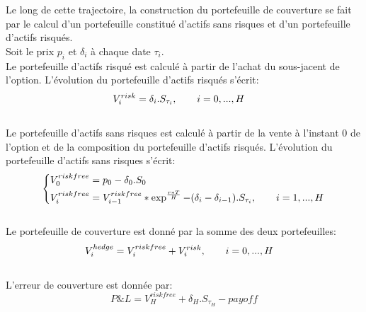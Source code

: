 \documentclass[french,12pt,a4paper]{article}
\begin{document}
Le long de cette trajectoire, la construction du portefeuille de couverture se fait par le calcul d'un portefeuille constitué d'actifs sans risques et d'un portefeuille d'actifs risqués.\\
Soit le prix $p_{i}$ et $\delta_{i}$ à chaque date $\tau_{i}$. \\
Le portefeuille d'actifs risqué est calculé à partir de l'achat du sous-jacent de l'option. L'évolution du portefeuille d'actifs risqués s'écrit:\\
$$
     \vspace{-3ex}
        \begin{aligned}
          & V^{risk}_{i} = \delta_{i}.S_{\tau_{i}}, \hspace{7 mm}  i=0,...,H 
        \end{aligned}
 $$
\\
Le portefeuille d'actifs sans risques est calculé à partir de la vente à l'instant 0 de l'option et de la composition du portefeuille d'actifs risqués. L'évolution du portefeuille d'actifs sans risques s'écrit:\\
$$
  \left\{%
     \vspace{-3ex}
        \begin{aligned}
          & V^{risk free}_{0} = p_{0}-\delta_{0}.S_{0} \\
          & V^{risk free}_{i} = V^{risk free}_{i-1}*\exp^{\frac{r*T}{H}}-(\delta_{i}-\delta_{i-1}).S_{\tau_{i}}, \hspace{7 mm}  i=1,...,H 
        \end{aligned}
 \right.
 $$
\\

Le portefeuille de couverture est donné par la somme des deux portefeuilles:
$$
	\vspace{-3ex}
        \begin{aligned}
          & V^{hedge}_{i} = V^{risk free}_{i} + V^{risk}_{i}, \hspace{7 mm}  i=0,...,H 
        \end{aligned}
$$
\\
L'erreur de couverture est donnée par:
 $$P\&L = V^{risk free}_{H}+\delta_{H}.S_{\tau_{H}}-payoff$$
\end{document}

